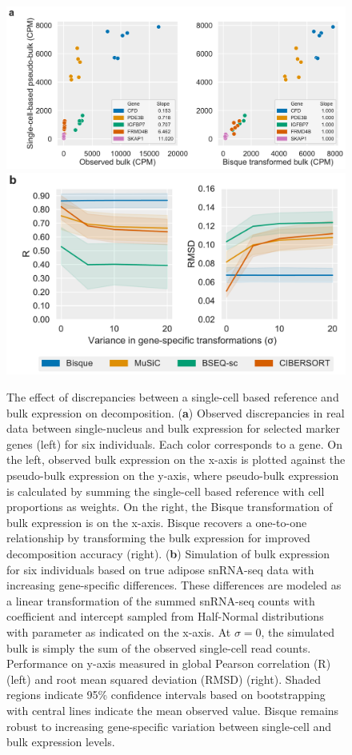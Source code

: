 \begin{figure}
    \centering
    \includegraphics[scale=\figscale]{chapter2/figures/fig2a.pdf} \\[0.25in]
    \includegraphics[scale=\figscale]{chapter2/figures/fig2b.pdf}
    \\[0.25in]
    \caption{
             The effect of discrepancies between a single-cell based reference and bulk expression on decomposition. (\textbf{a}) Observed discrepancies in real data between single-nucleus and bulk expression for selected
             marker genes (left) for six individuals. Each color corresponds to a gene. On the left, observed bulk expression on the x-axis is plotted against the pseudo-bulk expression on the y-axis, where pseudo-bulk expression is calculated by summing the single-cell based reference with cell proportions as weights. On the right, the Bisque transformation of bulk expression is on the x-axis. Bisque recovers a one-to-one relationship by transforming the bulk expression 
             for improved decomposition accuracy (right).  
             (\textbf{b}) Simulation of bulk expression for six individuals based on true adipose snRNA-seq data with increasing gene-specific differences. These differences are modeled as a linear transformation of the summed snRNA-seq counts with coefficient and intercept sampled from Half-Normal distributions with parameter as indicated on the x-axis. At $\sigma=0$, the simulated bulk is simply the sum of the observed single-cell read counts. Performance on y-axis measured in global Pearson correlation (R) (left) and root mean squared deviation (RMSD) (right). Shaded regions indicate 95\% confidence intervals based on bootstrapping with central lines indicate the mean observed value. Bisque remains robust to increasing gene-specific variation between single-cell and bulk expression levels.
            }
    \label{fig:fig2.2}
\end{figure}
